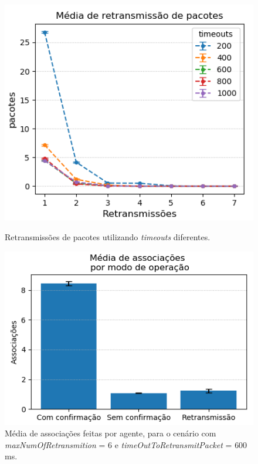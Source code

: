 \begin{figure}[htbp]
\centering
\begin{minipage}{.5\textwidth}
\centering
\includegraphics[width=.9\textwidth]{figures/retransmicoes.png}
\caption{Retransmissões de pacotes utilizando \textit{timeouts} diferentes.}
\label{fig:retransmicoes}
\end{minipage}%
\centering
\begin{minipage}{.5\textwidth}
\centering
\includegraphics[width=.9\textwidth]{figures/associacoes.png}
\caption{Média de associações feitas por agente, para o cenário com \textit{maxNumOfRetransmition} = $6$ e  \textit{timeOutToRetransmitPacket} = $600$ ms.}
\label{fig:associacoes} 
\end{minipage}
\end{figure}

